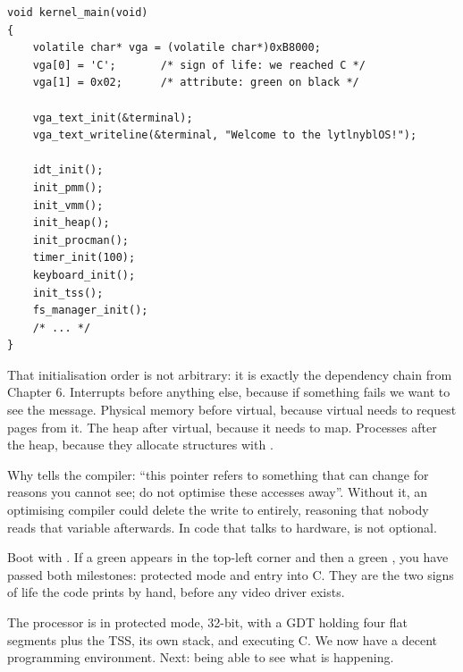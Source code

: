 \begin{lstlisting}[style=c]
void kernel_main(void)
{
    volatile char* vga = (volatile char*)0xB8000;
    vga[0] = 'C';       /* sign of life: we reached C */
    vga[1] = 0x02;      /* attribute: green on black */

    vga_text_init(&terminal);
    vga_text_writeline(&terminal, "Welcome to the lytlnyblOS!");

    idt_init();
    init_pmm();
    init_vmm();
    init_heap();
    init_procman();
    timer_init(100);
    keyboard_init();
    init_tss();
    fs_manager_init();
    /* ... */
}
\end{lstlisting}

That initialisation order is not arbitrary: it is exactly the dependency chain from Chapter 6.
Interrupts before anything else, because if something fails we want to see the message. Physical
memory before virtual, because virtual needs to request pages from it. The heap after virtual,
because it needs to map. Processes after the heap, because they allocate structures with
.

\begin{concept}{Why }
 tells the compiler: ``this pointer refers to something that can change for reasons
you cannot see; do not optimise these accesses away''. Without it, an optimising compiler could
delete the write to  entirely, reasoning that nobody reads that variable afterwards. In
code that talks to hardware,  is not optional.
\end{concept}

\begin{tryit}
Boot with . If a green  appears in the top-left corner and then a green
, you have passed both milestones: protected mode and entry into C. They are the two signs of
life the code prints by hand, before any video driver exists.
\end{tryit}

\begin{summary}
The processor is in protected mode, 32-bit, with a GDT holding four flat segments plus the TSS, its
own stack, and executing C. We now have a decent programming environment. Next: being able to see
what is happening.
\end{summary}
